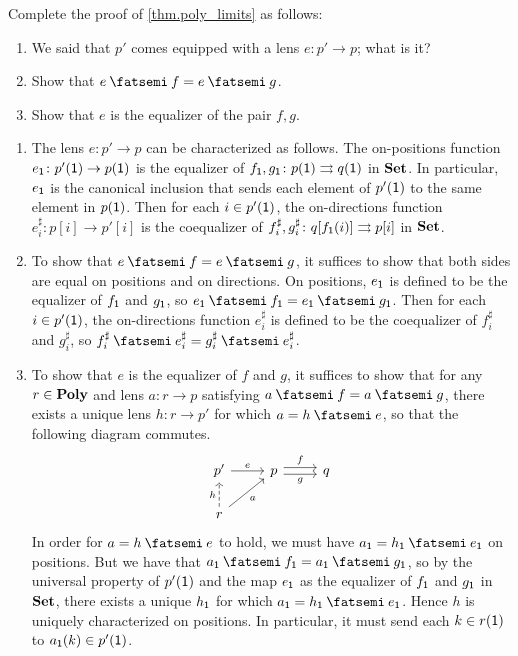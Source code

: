 \documentclass[Book-Poly]{subfiles}
\begin{document}
\begin{exercise}\label{exc.poly_limits}
Complete the proof of \cref{thm.poly_limits} as follows:
\begin{enumerate}
	\item We said that $p'$ comes equipped with a lens $e \colon p' \to p$; what is it?
	\item Show that $e \then f = e \then g$.
	\item Show that $e$ is the equalizer of the pair $f,g$.
\qedhere
\end{enumerate}
\begin{solution}
\begin{enumerate}
    \item The lens $e \colon p' \to p$ can be characterized as follows.
    The on-positions function $e_{\textsf{1}} \colon p'(\textsf{1}) \to p(\textsf{1})$ is the equalizer of $f_{\textsf{1}}, g_{\textsf{1}} \colon p(\textsf{1}) \rightrightarrows q(\textsf{1})$ in $\mathbf{Set}$.
    In particular, $e_{\textsf{1}}$ is the canonical inclusion that sends each element of $p'(\textsf{1})$ to the same element in $p(\textsf{1})$.
    Then for each $i \in p'(\textsf{1})$, the on-directions function $e^\sharp_i \colon p[i] \to p'[i]$ is the coequalizer of $f^\sharp_i, g^\sharp_i \colon q[f_{\textsf{1}}(i)] \rightrightarrows p[i]$ in $\mathbf{Set}$.

    \item To show that $e \then f = e \then g$, it suffices to show that both sides are equal on positions and on directions.
    On positions, $e_{\textsf{1}}$ is defined to be the equalizer of $f_{\textsf{1}}$ and $g_{\textsf{1}}$, so $e_\1 \then f_\1 = e_\1 \then g_\1$.
    Then for each $i \in p'(\textsf{1})$, the on-directions function $e^\sharp_i$ is defined to be the coequalizer of $f^\sharp_i$ and $g^\sharp_i$, so $f^\sharp_i \then e^\sharp_i = g^\sharp_i \then e^\sharp_i$.

    \item To show that $e$ is the equalizer of $f$ and $g$, it suffices to show that for any $r \in \mathbf{Poly}$ and lens $a \colon r \to p$ satisfying $a \then f = a \then g$, there exists a unique lens $h \colon r \to p'$ for which $a = h \then e$, so that the following diagram commutes.
    \begin{equation*} %
    \begin{tikzcd}
        p' \ar[r, "e"] & p \ar[r, "f", shift left] \ar[r, "g"', shift right] & q \\
        r \ar[u, "h", dashed] \ar[ur, "a"']
    \end{tikzcd}
    \end{equation*}
    In order for $a = h \then e$ to hold, we must have $a_\1 = h_\1 \then e_\1$ on positions.
    But we have that $a_\1 \then f_\1 = a_\1 \then g_\1$, so by the universal property of $p'(\textsf{1})$ and the map $e_{\textsf{1}}$ as the equalizer of $f_{\textsf{1}}$ and $g_{\textsf{1}}$ in $\mathbf{Set}$, there exists a unique $h_{\textsf{1}}$ for which $a_\1 = h_\1 \then e_\1$.
    Hence $h$ is uniquely characterized on positions.
    In particular, it must send each $k \in r(\textsf{1})$ to $a_{\textsf{1}}(k) \in p'(\textsf{1})$.


\end{enumerate}
\end{solution}
\end{exercise}
\end{document}
